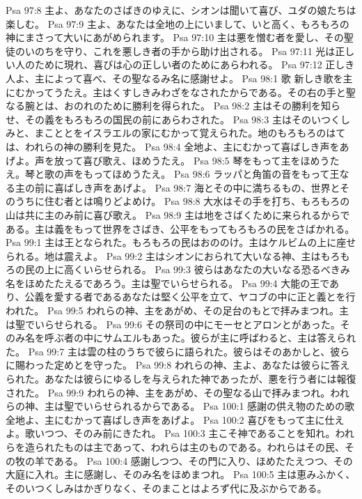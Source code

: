 Psa 97:8  主よ、あなたのさばきのゆえに、シオンは聞いて喜び、ユダの娘たちは楽しむ。
Psa 97:9  主よ、あなたは全地の上にいまして、いと高く、もろもろの神にまさって大いにあがめられます。
Psa 97:10  主は悪を憎む者を愛し、その聖徒のいのちを守り、これを悪しき者の手から助け出される。
Psa 97:11  光は正しい人のために現れ、喜びは心の正しい者のためにあらわれる。
Psa 97:12  正しき人よ、主によって喜べ、その聖なるみ名に感謝せよ。
Psa 98:1  歌 新しき歌を主にむかってうたえ。主はくすしきみわざをなされたからである。その右の手と聖なる腕とは、おのれのために勝利を得られた。
Psa 98:2  主はその勝利を知らせ、その義をもろもろの国民の前にあらわされた。
Psa 98:3  主はそのいつくしみと、まこととをイスラエルの家にむかって覚えられた。地のもろもろのはては、われらの神の勝利を見た。
Psa 98:4  全地よ、主にむかって喜ばしき声をあげよ。声を放って喜び歌え、ほめうたえ。
Psa 98:5  琴をもって主をほめうたえ。琴と歌の声をもってほめうたえ。
Psa 98:6  ラッパと角笛の音をもって王なる主の前に喜ばしき声をあげよ。
Psa 98:7  海とその中に満ちるもの、世界とそのうちに住む者とは鳴りどよめけ。
Psa 98:8  大水はその手を打ち、もろもろの山は共に主のみ前に喜び歌え。
Psa 98:9  主は地をさばくために来られるからである。主は義をもって世界をさばき、公平をもってもろもろの民をさばかれる。
Psa 99:1  主は王となられた。もろもろの民はおののけ。主はケルビムの上に座せられる。地は震えよ。
Psa 99:2  主はシオンにおられて大いなる神、主はもろもろの民の上に高くいらせられる。
Psa 99:3  彼らはあなたの大いなる恐るべきみ名をほめたたえるであろう。主は聖でいらせられる。
Psa 99:4  大能の王であり、公義を愛する者であるあなたは堅く公平を立て、ヤコブの中に正と義とを行われた。
Psa 99:5  われらの神、主をあがめ、その足台のもとで拝みまつれ。主は聖でいらせられる。
Psa 99:6  その祭司の中にモーセとアロンとがあった。そのみ名を呼ぶ者の中にサムエルもあった。彼らが主に呼ばわると、主は答えられた。
Psa 99:7  主は雲の柱のうちで彼らに語られた。彼らはそのあかしと、彼らに賜わった定めとを守った。
Psa 99:8  われらの神、主よ、あなたは彼らに答えられた。あなたは彼らにゆるしを与えられた神であったが、悪を行う者には報復された。
Psa 99:9  われらの神、主をあがめ、その聖なる山で拝みまつれ。われらの神、主は聖でいらせられるからである。
Psa 100:1  感謝の供え物のための歌 全地よ、主にむかって喜ばしき声をあげよ。
Psa 100:2  喜びをもって主に仕えよ。歌いつつ、そのみ前にきたれ。
Psa 100:3  主こそ神であることを知れ。われらを造られたものは主であって、われらは主のものである。われらはその民、その牧の羊である。
Psa 100:4  感謝しつつ、その門に入り、ほめたたえつつ、その大庭に入れ。主に感謝し、そのみ名をほめまつれ。
Psa 100:5  主は恵みふかく、そのいつくしみはかぎりなく、そのまことはよろず代に及ぶからである。
